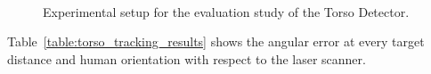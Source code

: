 \begin{figure}[h]
\centering
        \\ %
    \caption{%
	Experimental setup for the evaluation study of the Torso Detector.
     }%
   \label{fig:torso_tracking_exp_setup}
\end{figure}


Table~\ref{table:torso_tracking_results} shows the angular error at every target distance and human orientation with respect to the laser scanner. 

